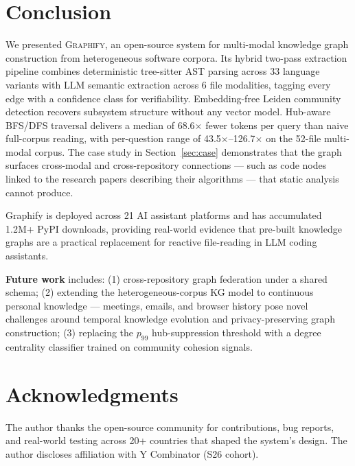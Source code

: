 \section{Conclusion}
\label{sec:conclusion}

We presented \textsc{Graphify}, an open-source system for multi-modal knowledge
graph construction from heterogeneous software corpora. Its hybrid two-pass
extraction pipeline combines deterministic tree-sitter AST parsing across 33
language variants with LLM semantic extraction across 6 file modalities, tagging
every edge with a confidence class for verifiability. Embedding-free Leiden
community detection recovers subsystem structure without any vector model.
Hub-aware BFS/DFS traversal delivers a median of 68.6$\times$ fewer tokens per
query than naive full-corpus reading, with per-question range of
43.5$\times$--126.7$\times$ on the 52-file multi-modal corpus. The case study in
Section~\ref{sec:case} demonstrates that the graph surfaces cross-modal and
cross-repository connections --- such as code nodes linked to the research papers
describing their algorithms --- that static analysis cannot produce.

Graphify is deployed across 21 AI assistant platforms and has accumulated 1.2M+
PyPI downloads, providing real-world evidence that pre-built knowledge graphs
are a practical replacement for reactive file-reading in LLM coding assistants.

\smallskip
\noindent\textbf{Future work} includes: (1) cross-repository graph federation
under a shared schema; (2) extending the heterogeneous-corpus KG model to
continuous personal knowledge --- meetings, emails, and browser history pose
novel challenges around temporal knowledge evolution and privacy-preserving
graph construction; (3) replacing the $p_{99}$ hub-suppression threshold with a
degree centrality classifier trained on community cohesion signals.

\section*{Acknowledgments}
The author thanks the open-source community for contributions, bug reports,
and real-world testing across 20+ countries that shaped the system's design.
The author discloses affiliation with Y Combinator (S26 cohort).
